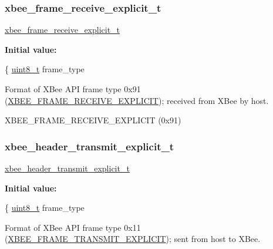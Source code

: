 \subsubsection{\texorpdfstring{xbee\+\_\+frame\+\_\+receive\+\_\+explicit\+\_\+t}{xbee\_frame\_receive\_explicit\_t}}
{\footnotesize\ttfamily \hyperlink{group__xbee__wpan_gad36b64f2e729281d8b7704f6e9906e82}{xbee\+\_\+frame\+\_\+receive\+\_\+explicit\+\_\+t}}

{\bfseries Initial value\+:}
\begin{DoxyCode}
\{
   \hyperlink{group__hal__dos_gae1affc9ca37cfb624959c866a73f83c2}{uint8\_t}       frame\_type
\end{DoxyCode}


Format of X\+Bee A\+PI frame type 0x91 (\hyperlink{group__xbee__device_gga7753bbebaf00d6d64942f64b6ae9b7b9a8f80b5fa338b8bf34888ffcbfd260a54}{X\+B\+E\+E\+\_\+\+F\+R\+A\+M\+E\+\_\+\+R\+E\+C\+E\+I\+V\+E\+\_\+\+E\+X\+P\+L\+I\+C\+IT}); received from X\+Bee by host. 

X\+B\+E\+E\+\_\+\+F\+R\+A\+M\+E\+\_\+\+R\+E\+C\+E\+I\+V\+E\+\_\+\+E\+X\+P\+L\+I\+C\+IT (0x91) \mbox{\label{group__xbee__wpan_gac2df4f67492506916726d8002ca5f2bd}} 
\subsubsection{\texorpdfstring{xbee\+\_\+header\+\_\+transmit\+\_\+explicit\+\_\+t}{xbee\_header\_transmit\_explicit\_t}}
{\footnotesize\ttfamily \hyperlink{group__xbee__wpan_gac2df4f67492506916726d8002ca5f2bd}{xbee\+\_\+header\+\_\+transmit\+\_\+explicit\+\_\+t}}

{\bfseries Initial value\+:}
\begin{DoxyCode}
\{
   \hyperlink{group__hal__dos_gae1affc9ca37cfb624959c866a73f83c2}{uint8\_t}       frame\_type
\end{DoxyCode}


Format of X\+Bee A\+PI frame type 0x11 (\hyperlink{group__xbee__device_gga7753bbebaf00d6d64942f64b6ae9b7b9aa673474f9f3597929def38ad4cf7d63e}{X\+B\+E\+E\+\_\+\+F\+R\+A\+M\+E\+\_\+\+T\+R\+A\+N\+S\+M\+I\+T\+\_\+\+E\+X\+P\+L\+I\+C\+IT}); sent from host to X\+Bee. 

